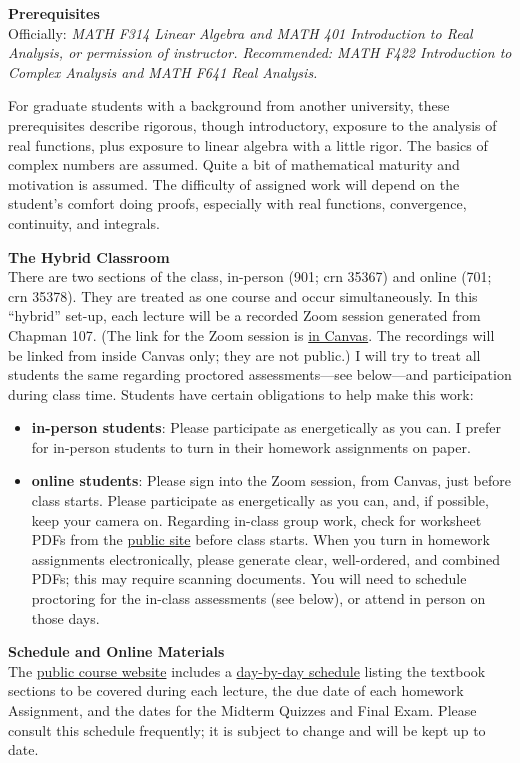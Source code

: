 \documentclass[12pt]{article}
\renewcommand{\emph}[1]{\textsf{\textbf{#1}}}
\newcommand{\localhead}[1]{\par\smallskip\textbf{#1} \smallskip\nobreak\\}%
\def\heading#1{\localhead{\large\emph{#1}}}
\begin{document}
\clearpage\newpage
\phantom{foo}
\heading{Prerequisites}
Officially: \textsl{MATH F314 Linear Algebra and MATH 401 Introduction to Real Analysis, or permission of instructor. Recommended: MATH F422 Introduction to Complex Analysis and MATH F641 Real Analysis.}

For graduate students with a background from another university, these prerequisites describe rigorous, though introductory, exposure to the analysis of real functions, plus exposure to linear algebra with a little rigor.  The basics of complex numbers are assumed.  Quite a bit of mathematical maturity and motivation is assumed.  The difficulty of assigned work will depend on the student's comfort doing proofs, especially with real functions, convergence, continuity, and integrals.


\heading{The Hybrid Classroom}
There are two sections of the class, in-person (901; crn 35367) and online (701; crn 35378).  They are treated as one course and occur simultaneously.  In this ``hybrid'' set-up, each lecture will be a recorded Zoom session generated from Chapman 107.  (The link for the Zoom session is \href{https://canvas.alaska.edu/courses/18441}{in Canvas}.  The recordings will be linked from inside Canvas only; they are not public.)  I will try to treat all students the same regarding proctored assessments---see below---and participation during class time.  Students have certain obligations to help make this work:
\begin{itemize}
\item \textbf{in-person students}: Please participate as energetically as you can.  I prefer for in-person students to turn in their homework assignments on paper.
\item \textbf{online students}:  Please sign into the Zoom session, from Canvas, just before class starts.  Please participate as energetically as you can, and, if possible, keep your camera on.  Regarding in-class group work, check for worksheet PDFs from the \href{https://bueler.github.io/fa/}{public site} before class starts.  When you turn in homework assignments electronically, please generate clear, well-ordered, and combined PDFs; this may require scanning documents.  You will need to schedule proctoring for the in-class assessments (see below), or attend in person on those days.
\end{itemize}


\heading{Schedule and Online Materials}
The \href{https://bueler.github.io/fa/}{public course website} includes a \href{https://bueler.github.io/nla/assets/general/S24/schedule.pdf}{day-by-day schedule} listing the textbook sections to be covered during each lecture, the due date of each homework Assignment, and the dates for the Midterm Quizzes and Final Exam.  Please consult this schedule frequently; it is subject to change and will be kept up to date.
\end{document}
